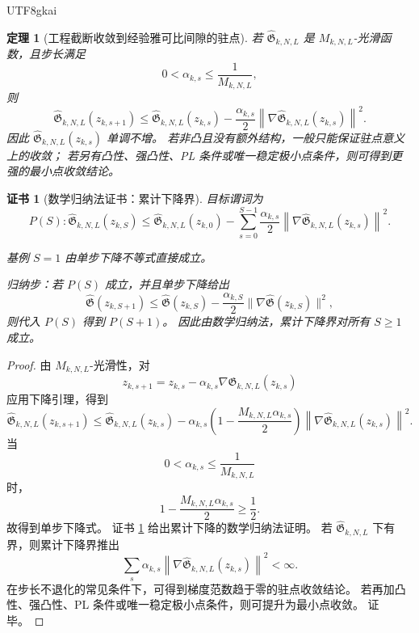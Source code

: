 \documentclass[12pt]{article}
\newtheorem{theorem}{定理}[section]
\newtheorem{Certificate}{证书}[section]
\begin{document}
\begin{CJK*}{UTF8}{gkai}
\begin{theorem}[工程截断收敛到经验雅可比间隙的驻点]
\label{thm:tex55-engdet-empirical-stationary}
若 \(\widehat{\mathfrak G}_{k,N,L}\) 是 \(M_{k,N,L}\)-光滑函数，且步长满足
\[
  0<\alpha_{k,s}\le\frac1{M_{k,N,L}},
\]
则
\[
  \widehat{\mathfrak G}_{k,N,L}(z_{k,s+1})
  \le
  \widehat{\mathfrak G}_{k,N,L}(z_{k,s})
  -
  \frac{\alpha_{k,s}}{2}
  \left\lVert
  \nabla\widehat{\mathfrak G}_{k,N,L}(z_{k,s})
  \right\rVert^2.
\]
因此 \(\widehat{\mathfrak G}_{k,N,L}(z_{k,s})\) 单调不增。
若非凸且没有额外结构，一般只能保证驻点意义上的收敛；
若另有凸性、强凸性、PL 条件或唯一稳定极小点条件，则可得到更强的最小点收敛结论。
\end{theorem}

\begin{Certificate}[数学归纳法证书：累计下降界]
\label{cert:tex55-engdet-empirical-stationary}
目标谓词为
\[
  P(S):
  \widehat{\mathfrak G}_{k,N,L}(z_{k,S})
  \le
  \widehat{\mathfrak G}_{k,N,L}(z_{k,0})
  -
  \sum_{s=0}^{S-1}
  \frac{\alpha_{k,s}}2
  \left\lVert
  \nabla\widehat{\mathfrak G}_{k,N,L}(z_{k,s})
  \right\rVert^2.
\]

基例 \(S=1\) 由单步下降不等式直接成立。

归纳步：若 \(P(S)\) 成立，并且单步下降给出
\[
  \widehat{\mathfrak G}(z_{k,S+1})
  \le
  \widehat{\mathfrak G}(z_{k,S})
  -
  \frac{\alpha_{k,S}}2
  \lVert\nabla\widehat{\mathfrak G}(z_{k,S})\rVert^2,
\]
则代入 \(P(S)\) 得到 \(P(S+1)\)。
因此由数学归纳法，累计下降界对所有 \(S\ge1\) 成立。
\end{Certificate}

\begin{proof}
由 \(M_{k,N,L}\)-光滑性，对
\[
  z_{k,s+1}
  =
  z_{k,s}
  -
  \alpha_{k,s}
  \nabla\widehat{\mathfrak G}_{k,N,L}(z_{k,s})
\]
应用下降引理，得到
\[
  \widehat{\mathfrak G}_{k,N,L}(z_{k,s+1})
  \le
  \widehat{\mathfrak G}_{k,N,L}(z_{k,s})
  -
  \alpha_{k,s}
  \left(
  1-\frac{M_{k,N,L}\alpha_{k,s}}2
  \right)
  \left\lVert
  \nabla\widehat{\mathfrak G}_{k,N,L}(z_{k,s})
  \right\rVert^2.
\]
当
\[
  0<\alpha_{k,s}\le\frac1{M_{k,N,L}}
\]
时，
\[
  1-\frac{M_{k,N,L}\alpha_{k,s}}2\ge\frac12.
\]
故得到单步下降式。
证书 \ref{cert:tex55-engdet-empirical-stationary} 给出累计下降的数学归纳法证明。
若 \(\widehat{\mathfrak G}_{k,N,L}\) 下有界，则累计下降界推出
\[
  \sum_s
  \alpha_{k,s}
  \left\lVert
  \nabla\widehat{\mathfrak G}_{k,N,L}(z_{k,s})
  \right\rVert^2
  <\infty.
\]
在步长不退化的常见条件下，可得到梯度范数趋于零的驻点收敛结论。
若再加凸性、强凸性、PL 条件或唯一稳定极小点条件，则可提升为最小点收敛。
证毕。
\end{proof}


\end{CJK*}
\end{document}
